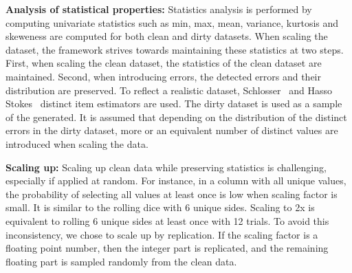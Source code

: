 \textbf{Analysis of statistical properties:} 
Statistics analysis is performed by computing univariate statistics such as min, max, mean, variance, kurtosis and skeweness are computed for both clean and dirty datasets.
When scaling the dataset, the framework strives towards maintaining these statistics at two steps.
First, when scaling the clean dataset, the statistics of the clean dataset are maintained. 
Second, when introducing errors, the detected errors and their distribution are preserved.
To reflect a realistic dataset, Schlosser~\cite{HassNSS1995} and Hasso Stokes~\cite{HassS1998} distinct item estimators are used. 
The dirty dataset is used as a sample of the generated. It is assumed that depending on the distribution of the distinct errors in the dirty dataset, more or an equivalent number of distinct values are introduced when scaling the data.

\textbf{Scaling up:} 
Scaling up clean data while preserving statistics is challenging, especially if applied at random. 
For instance, in a column with all unique values, the probability of selecting all values at least once is low when scaling factor is small. 
It is similar to the rolling dice with 6 unique sides. 
Scaling to 2x is equivalent to rolling 6 unique sides at least once with 12 trials.
To avoid this inconsistency, we chose to scale up by replication. 
If the scaling factor is a floating point number, then the integer part is replicated, and the remaining floating part is sampled randomly from the clean data.



